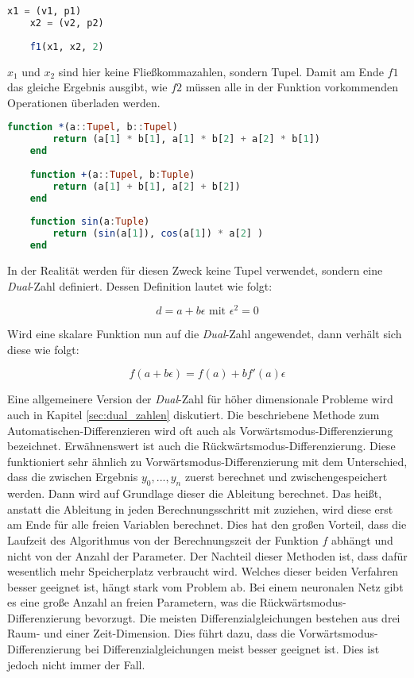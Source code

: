 \begin{lstlisting}[language=Julia]
	x1 = (v1, p1)
    x2 = (v2, p2)
    
    f1(x1, x2, 2)
\end{lstlisting}

$x_1$ und $x_2$ sind hier keine Fließkommazahlen, sondern Tupel.
Damit am Ende $f1$ das gleiche Ergebnis ausgibt, wie $f2$ müssen alle in der Funktion vorkommenden Operationen überladen werden.

\begin{lstlisting}[language=Julia]
	function *(a::Tupel, b::Tupel)
    	return (a[1] * b[1], a[1] * b[2] + a[2] * b[1]) 
    end
    
    function +(a::Tupel, b:Tuple)
    	return (a[1] + b[1], a[2] + b[2])
    end
    
    function sin(a:Tuple)
    	return (sin(a[1]), cos(a[1]) * a[2] ) 
    end
\end{lstlisting}

In der Realität werden für diesen Zweck keine Tupel verwendet, sondern eine \textit{Dual}-Zahl definiert.
Dessen Definition lautet wie folgt:

\begin{equation}
	d = a + b \epsilon \text{ mit } \epsilon^2 = 0
\end{equation}

Wird eine skalare Funktion nun auf die \textit{Dual}-Zahl angewendet, dann verhält sich diese wie folgt:

\begin{equation}
	f( a + b \epsilon) = f(a) + b f'(a) \epsilon
\end{equation}

Eine allgemeinere Version der \textit{Dual}-Zahl für höher dimensionale Probleme wird auch in Kapitel \ref{sec:dual_zahlen} diskutiert.
Die beschriebene Methode zum Automatischen-Differenzieren wird oft auch als Vorwärtsmodus-Differenzierung bezeichnet.
Erwähnenswert ist auch die Rückwärtsmodus-Differenzierung.
Diese funktioniert sehr ähnlich zu Vorwärtsmodus-Differenzierung
mit dem Unterschied, dass die zwischen Ergebnis $y_0, ... , y_n$ zuerst berechnet und zwischengespeichert werden.
Dann wird auf Grundlage dieser die Ableitung berechnet.
Das heißt, anstatt die Ableitung in jeden Berechnungsschritt mit zuziehen, wird diese erst am Ende für alle freien Variablen berechnet.
Dies hat den großen Vorteil, dass die Laufzeit des Algorithmus von der Berechnungszeit der Funktion $f$ abhängt und nicht von der Anzahl der Parameter.
Der Nachteil dieser Methoden ist, dass dafür wesentlich mehr Speicherplatz verbraucht wird.
Welches dieser beiden Verfahren besser geeignet ist, hängt stark vom Problem ab.
Bei einem neuronalen Netz gibt es eine große Anzahl an freien Parametern, was die Rückwärtsmodus-Differenzierung bevorzugt.
Die meisten Differenzialgleichungen bestehen aus drei Raum- und einer Zeit-Dimension.
Dies führt dazu, dass die Vorwärtsmodus-Differenzierung bei Differenzialgleichungen meist besser geeignet ist.
Dies ist jedoch nicht immer der Fall.
